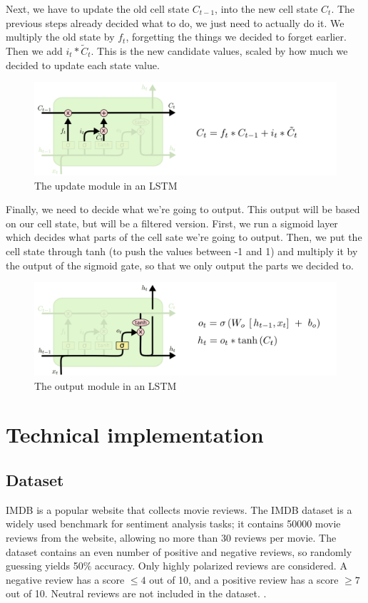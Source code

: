 \documentclass{article}
\begin{document}
Next, we have to update the old cell state $C_{t-1}$, into the new cell state $C_t$.
The previous steps already decided what to do, we just need to actually do it.
We multiply the old state by $f_t$, forgetting the things we decided to forget earlier.
Then we add $i_t * \tilde{C}_t$.
This is the new candidate values, scaled by how much we decided to update each state value.

\begin{figure}[htbp]
  \centering
  \includegraphics[width=0.6\linewidth]{img/lstm_update.png}
  \caption{The update module in an LSTM}
  \label{fig:lstm_update}
\end{figure}

Finally, we need to decide what we're going to output.
This output will be based on our cell state, but will be a filtered version.
First, we run a sigmoid layer which decides what parts of the cell sate we're going to output.
Then, we put the cell state through tanh (to push the values between -1 and 1) and multiply it by the output of the sigmoid gate, so that we only output the parts we decided to.

\begin{figure}[htbp]
  \centering
  \includegraphics[width=0.6\linewidth]{img/lstm_output.png}
  \caption{The output module in an LSTM}
  \label{fig:lstm_output}
\end{figure}

\section{Technical implementation}

\subsection{Dataset}
IMDB is a popular website that collects movie reviews.
The IMDB dataset is a widely used benchmark for sentiment analysis tasks;
it contains 50000 movie reviews from the website, allowing no more than 30 reviews per movie.
The dataset contains an even number of positive and negative reviews, so randomly guessing yields 50\% accuracy.
Only highly polarized reviews are considered.
A negative review has a score $\leq 4$ out of 10, and a positive review has a score $\geq 7$ out of 10. Neutral reviews are not included in the dataset. \cite{imdb_dataset_stanfordnlp}. 
\end{document}
